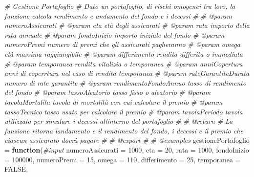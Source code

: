 \documentclass[
]{article}
\newenvironment{Shaded}{\begin{snugshade}}{\end{snugshade}}
\newcommand{\AttributeTok}[1]{\textcolor[rgb]{0.77,0.63,0.00}{#1}}
\newcommand{\CommentTok}[1]{\textcolor[rgb]{0.56,0.35,0.01}{\textit{#1}}}
\newcommand{\ConstantTok}[1]{\textcolor[rgb]{0.00,0.00,0.00}{#1}}
\newcommand{\ControlFlowTok}[1]{\textcolor[rgb]{0.13,0.29,0.53}{\textbf{#1}}}
\newcommand{\DecValTok}[1]{\textcolor[rgb]{0.00,0.00,0.81}{#1}}
\newcommand{\NormalTok}[1]{#1}
\newcommand{\OtherTok}[1]{\textcolor[rgb]{0.56,0.35,0.01}{#1}}
\begin{document}
\begin{Shaded}
\begin{Highlighting}[]
\CommentTok{\#\textquotesingle{} Gestione Portafoglio}
\CommentTok{\#\textquotesingle{} Dato un portafoglio, di rischi omogenei tra loro, la funzione calcola rendimento e andamento del fondo e i decessi }
\CommentTok{\#\textquotesingle{}}
\CommentTok{\#\textquotesingle{} @param numeroAssicurati }
\CommentTok{\#\textquotesingle{} @param eta età degli assicurati}
\CommentTok{\#\textquotesingle{} @param rata importo della rata annuale}
\CommentTok{\#\textquotesingle{} @param fondoInizio importo iniziale del fondo}
\CommentTok{\#\textquotesingle{} @param numeroPremi numero di premi che gli assicurati pagheranno}
\CommentTok{\#\textquotesingle{} @param omega età massima raggiungibile}
\CommentTok{\#\textquotesingle{} @param differimento rendita differita o immediata}
\CommentTok{\#\textquotesingle{} @param temporanea rendita vitalizia o temporanea}
\CommentTok{\#\textquotesingle{} @param anniCopertura anni di coperrtura nel caso di rendita temporanea}
\CommentTok{\#\textquotesingle{} @param rateGarantiteDurata numero di rate garantite}
\CommentTok{\#\textquotesingle{} @param rendimentoFondoAnnuo tasso di rendimento del fondo }
\CommentTok{\#\textquotesingle{} @param tassoAleatorio tasso fisso o aleatorio}
\CommentTok{\#\textquotesingle{} @param tavolaMortalita tavola di mortalità con cui calcolare il premio}
\CommentTok{\#\textquotesingle{} @param tassoTecnico tasso usato per calcolare il premio}
\CommentTok{\#\textquotesingle{} @param tavolaPeriodo tavola utilizzata per simulare i decessi all\textquotesingle{}interno del portafoglio}
\CommentTok{\#\textquotesingle{}}
\CommentTok{\#\textquotesingle{} @return}
\CommentTok{\#\textquotesingle{} La funzione ritorna l\textquotesingle{}andamento e il rendimento del fondo, i decessi e il premio che ciascun assicurato dovrà pagare}
\CommentTok{\#\textquotesingle{} }
\CommentTok{\#\textquotesingle{} @export}
\CommentTok{\#\textquotesingle{}}
\CommentTok{\#\textquotesingle{} @examples}
\NormalTok{gestionePortafoglio }\OtherTok{=} \ControlFlowTok{function}\NormalTok{(}\CommentTok{\#input}
  \AttributeTok{numeroAssicurati =} \DecValTok{1000}\NormalTok{,}
  \AttributeTok{eta =} \DecValTok{20}\NormalTok{,}
  \AttributeTok{rata =} \DecValTok{1000}\NormalTok{,}
  \AttributeTok{fondoInizio =} \DecValTok{100000}\NormalTok{,}
  \AttributeTok{numeroPremi =} \DecValTok{15}\NormalTok{,}
  \AttributeTok{omega =} \DecValTok{110}\NormalTok{,}
  \AttributeTok{differimento =} \DecValTok{25}\NormalTok{,}
  \AttributeTok{temporanea =} \ConstantTok{FALSE}\NormalTok{,}

\end{Highlighting}
\end{Shaded}
\end{document}
